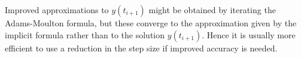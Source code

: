 Improved approximations to $y\left(t_{i+1}\right)$ might be obtained by iterating the Adams-Moulton formula, but these converge to the approximation given by the implicit formula rather than to the solution $y\left(t_{i+1}\right)$. Hence it is usually more efficient to use a reduction in the step size if improved accuracy is needed.

%
%
%
%
%
%
%
%
%
%
